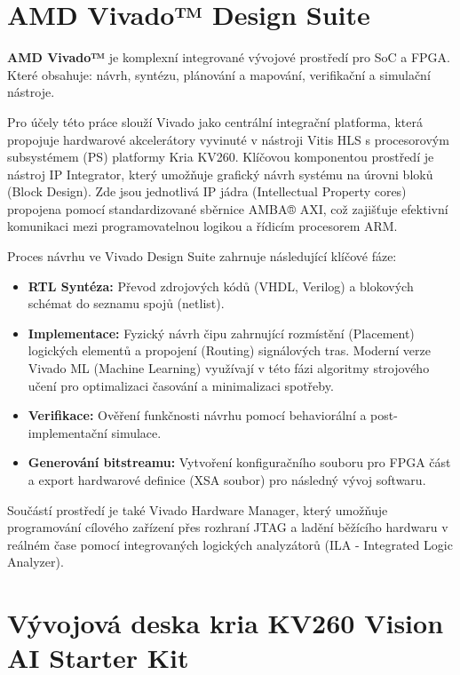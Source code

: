 \documentclass[FM,DP]{tulthesis}
\begin{document}
\newpage

\section{AMD Vivado™ Design Suite}
\textbf{AMD Vivado™} je komplexní integrované vývojové prostředí pro \ac{SoC} a \ac{FPGA}. Které obsahuje: návrh, syntézu, plánování a mapování, verifikační a simulační nástroje.

Pro účely této práce slouží Vivado jako centrální integrační platforma, která
propojuje hardwarové akcelerátory vyvinuté v nástroji Vitis HLS s procesorovým
subsystémem (PS) platformy Kria KV260. Klíčovou komponentou prostředí je
nástroj IP Integrator, který umožňuje grafický návrh systému na úrovni bloků
(Block Design). Zde jsou jednotlivá IP jádra (Intellectual Property cores)
propojena pomocí standardizované sběrnice AMBA® AXI, což zajišťuje efektivní
komunikaci mezi programovatelnou logikou a řídicím procesorem ARM.

Proces návrhu ve Vivado Design Suite zahrnuje následující klíčové fáze:

\begin{itemize}
    \item \textbf{RTL Syntéza:} Převod zdrojových kódů (VHDL, Verilog) a blokových schémat do seznamu spojů (netlist).

    \item \textbf{Implementace:} Fyzický návrh čipu zahrnující rozmístění (Placement) logických elementů a propojení (Routing) signálových tras. Moderní verze Vivado ML (Machine Learning) využívají v této fázi algoritmy strojového učení pro optimalizaci časování a minimalizaci spotřeby.

    \item \textbf{Verifikace:} Ověření funkčnosti návrhu pomocí behaviorální a post-implementační simulace.

    \item \textbf{Generování bitstreamu:} Vytvoření konfiguračního souboru pro FPGA část a export hardwarové definice (XSA soubor) pro následný vývoj softwaru.
\end{itemize}

Součástí prostředí je také Vivado Hardware Manager, který umožňuje programování
cílového zařízení přes rozhraní JTAG a ladění běžícího hardwaru v reálném čase
pomocí integrovaných logických analyzátorů (ILA - Integrated Logic Analyzer).

\section{Vývojová deska kria KV260 Vision AI Starter Kit}
\end{document}
